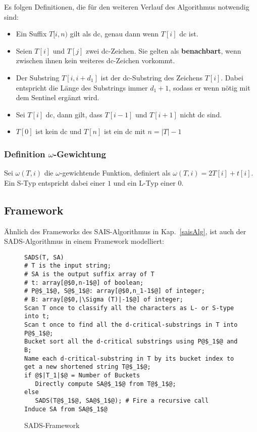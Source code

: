 \bigskip
\noindent Es folgen Definitionen, die für den weiteren Verlauf des Algorithmus notwendig sind:
\begin{itemize}
    \item   Ein Suffix $T[i,n)$ gilt als dc, genau dann wenn $T[i]$ dc ist.
    \item   Seien $T[i]$ und $T[j]$ zwei dc-Zeichen. Sie gelten als \textbf{benachbart}, wenn zwischen ihnen kein weiteres dc-Zeichen vorkommt.
    \item   Der Substring $T[i, i+d_1]$ ist der dc-Substring des Zeichens $T[i]$. Dabei entspricht die Länge des Substrings immer $d_1+1$, sodass er wenn nötig mit dem Sentinel ergänzt wird.
    \item   Sei $T[i]$ dc, dann gilt, dass $T[i-1]$ und $T[i+1]$ nicht dc sind.
    \item   $T[0]$ ist kein dc und $T[n]$ ist ein dc mit $n=|T|-1$
\end{itemize}
\subsubsection{Definition $\omega$-Gewichtung}
\label{weighting}
Sei $\omega(T,i)$ die $\omega$-gewichtende Funktion, definiert als $\omega(T,i) = 2T[i]+t[i]$. Ein S-Typ entspricht dabei einer $1$ und ein L-Typ einer $0$.
\newpage
\subsection{Framework}
Ähnlich des Frameworks des SAIS-Algorithmus in Kap.~\ref{saisAlg}, ist auch der SADS-Algorithmus in einem Framework\cite[Fig.~3]{saca:6} modelliert:
\label{sadsAlg}
\begin{figure}[h]
\begin{verbatim}
SADS(T, SA)
# T is the input string;
# SA is the output suffix array of T
# t: array[@$0,n-1$@] of boolean;
# P@$_1$@, S@$_1$@: array[@$0,n_1-1$@] of integer;
# B: array[@$0,|\Sigma (T)|-1$@] of integer;
Scan T once to classify all the characters as L- or S-type into t;
Scan t once to find all the d-critical-substrings in T into P@$_1$@;
Bucket sort all the d-critical substrings using P@$_1$@ and B;
Name each d-critical-substring in T by its bucket index to get a new shortened string T@$_1$@;
if @$|T_1|$@ = Number of Buckets
   Directly compute SA@$_1$@ from T@$_1$@;
else
   SADS(T@$_1$@, SA@$_1$@); # Fire a recursive call
Induce SA from SA@$_1$@
\end{verbatim}
\caption{SADS-Framework}
\end{figure}


